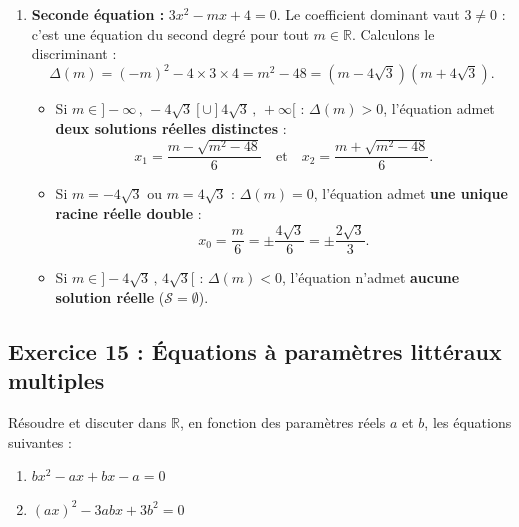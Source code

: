 \documentclass[11pt,a4paper]{article}
\newcommand{\R}{\mathbb{R}}
\begin{document}
\begin{correctionbox}
\begin{enumerate}
    \item \textbf{Seconde équation :} $3x^2 - mx + 4 = 0$.
    Le coefficient dominant vaut $3 \neq 0$ : c'est une équation du second degré pour tout $m \in \R$.
    Calculons le discriminant :
    \[
    \Delta(m) = (-m)^2 - 4 \times 3 \times 4 = m^2 - 48 = (m - 4\sqrt{3})(m + 4\sqrt{3}).
    \]
    \begin{itemize}
        \item Si $m \in ]-\infty\,,\, -4\sqrt{3}[ \cup ]4\sqrt{3}\,,\, +\infty[$ : $\Delta(m) > 0$, l'équation admet \textbf{deux solutions réelles distinctes} :
        \[
        x_1 = \frac{m - \sqrt{m^2 - 48}}{6} \quad \text{et} \quad x_2 = \frac{m + \sqrt{m^2 - 48}}{6}.
        \]
        \item Si $m = -4\sqrt{3}$ ou $m = 4\sqrt{3}$ : $\Delta(m) = 0$, l'équation admet \textbf{une unique racine réelle double} :
        \[
        x_0 = \frac{m}{6} = \pm \frac{4\sqrt{3}}{6} = \pm \frac{2\sqrt{3}}{3}.
        \]
        \item Si $m \in ]-4\sqrt{3}\,,\, 4\sqrt{3}[$ : $\Delta(m) < 0$, l'équation n'admet \textbf{aucune solution réelle} ($\mathcal{S} = \emptyset$).
    \end{itemize}
\end{enumerate}
\end{correctionbox}

\subsection*{Exercice 15 : Équations à paramètres littéraux multiples}
Résoudre et discuter dans $\R$, en fonction des paramètres réels $a$ et $b$, les équations suivantes :
\begin{enumerate}
    \item $bx^2 - ax + bx - a = 0$
    \item $(ax)^2 - 3abx + 3b^2 = 0$
\end{enumerate}
\end{document}
